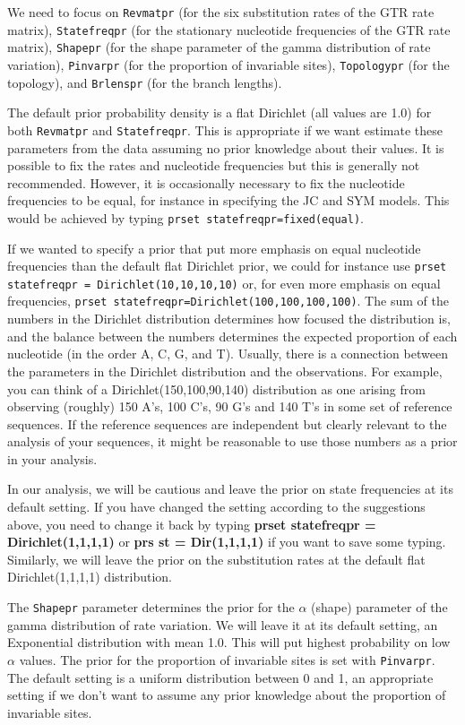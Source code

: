 \documentclass[12pt]{book}
\begin{document}
We need to focus on \texttt{Revmatpr} (for the six substitution rates of the GTR rate matrix),
 \texttt{Statefreqpr} (for the stationary nucleotide frequencies of the GTR rate matrix), \texttt{Shapepr}
 (for the shape parameter of the gamma distribution of rate variation), \texttt{Pinvarpr}
 (for the proportion of invariable sites), \texttt{Topologypr} (for the topology), and \texttt{Brlenspr}
 (for the branch lengths).

The default prior probability density is a flat Dirichlet (all values are 1.0) for both \texttt{Revmatpr}
 and \texttt{Statefreqpr}. This is appropriate if we want estimate these parameters from the data assuming
 no prior knowledge about their values. It is possible to fix the rates and nucleotide frequencies but this
 is generally not recommended. However, it is occasionally necessary to fix the nucleotide frequencies to
 be equal, for instance in specifying the JC and SYM models. This would be achieved by typing
 \texttt{prset statefreqpr=fixed(equal)}.

If we wanted to specify a prior that put more emphasis on equal nucleotide frequencies than the default
 flat Dirichlet prior, we could for instance use \texttt{prset statefreqpr = Dirichlet(10,10,10,10)} or,
 for even more emphasis on equal frequencies, \texttt{prset statefreqpr=Dirichlet(100,100,100,100)}. The
 sum of the numbers in the Dirichlet distribution determines how focused the distribution is, and the
 balance between the numbers determines the expected proportion of each nucleotide (in the order A, C, G,
 and T). Usually, there is a connection between the parameters in the Dirichlet distribution and the
 observations. For example, you can think of a Dirichlet(150,100,90,140) distribution as one arising from
 observing (roughly) 150 A's, 100 C's, 90 G's and 140 T's in some set of reference sequences. If the
 reference sequences are independent but clearly relevant to the analysis of your sequences, it might be
 reasonable to use those numbers as a prior in your analysis. 

In our analysis, we will be cautious and leave the prior on state frequencies at its default setting. If you
 have changed the setting according to the suggestions above, you need to change it back by typing
 \textbf{prset statefreqpr = Dirichlet(1,1,1,1)} or \textbf{prs st = Dir(1,1,1,1)} if you want to save some
 typing. Similarly, we will leave the prior on the substitution rates at the default flat
 Dirichlet(1,1,1,1) distribution.

The \texttt{Shapepr} parameter determines the prior for the $\alpha$ (shape) parameter of the gamma
 distribution of rate variation. We will leave it at its default setting, an Exponential distribution
 with mean 1.0. This will put highest probability on low $\alpha$ values. 
 The prior for the proportion of invariable sites is set with \texttt{Pinvarpr}. The default setting
 is a uniform distribution between 0 and 1, an appropriate setting if we don't want to assume any prior
 knowledge about the proportion of invariable sites.
\end{document}
